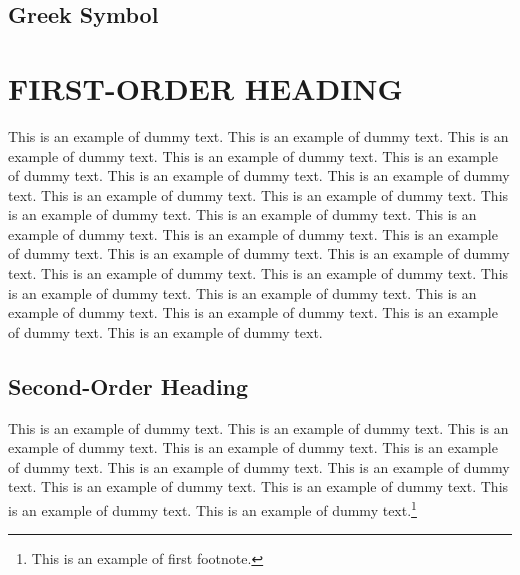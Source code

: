 \documentclass{aer}      %
\begin{document}

\subsection*{Greek Symbol}
\begin{deflist}
\end{deflist}


\section{FIRST-ORDER HEADING}%
This is an example of dummy text. This is an example of dummy text. This is an example of dummy text. This is an example of dummy text. This is an example of dummy text. This is an example of dummy text. This is an example of dummy text. This is an example of dummy text. This is an example of dummy text. This is an example of dummy text. This is an example of dummy text. This is an example of dummy text. This is an example of dummy text. This is an example of dummy text. This is an example of dummy text. This is an example of dummy text. This is an example of dummy text. This is an example of dummy text. This is an example of dummy text. This is an example of dummy text. This is an example of dummy text. This is an example of dummy text. This is an example of dummy text. This is an example of dummy text.


\subsection{Second-Order Heading}%
This is an example of dummy text. This is an example of dummy text. This is an example of dummy text.
This is an example of dummy text. This is an example of dummy text. This is an example of dummy text.
This is an example of dummy text. This is an example of dummy text. This is an example of dummy text.
This is an example of dummy text. This is an example of dummy text.\footnote{This is an example of first footnote.}
\end{document}
